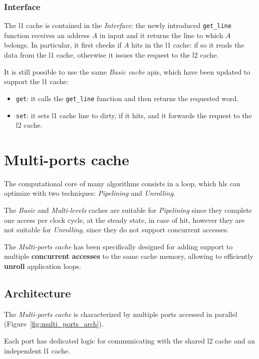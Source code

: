 \documentclass[11pt,a4paper,oneside]{memoir}
\begin{document}
\subsection{Interface}
The \ac{l1} cache is contained in the \emph{Interface}: the newly introduced
\texttt{get\_line} function receives an address $A$ in input and it returns the
line to which $A$ belongs.
In particular, it first checks if $A$ hits in the \ac{l1} cache: if so it reads
the data from the \ac{l1} cache, otherwise it issues the request to the \ac{l2}
cache.

\bigskip
It is still possible to use the same \emph{Basic cache} \acp{api}, which have
been updated to support the \ac{l1} cache:
\begin{itemize}
	\item \texttt{get}: it calls the \texttt{get\_line} function and then
		returns the requested word.
	\item \texttt{set}: it sets \ac{l1} cache line to dirty, if it hits, and
		it forwards the request to the \ac{l2} cache.
\end{itemize}

\chapter{Multi-ports cache}
The computational core of many algorithms consists in a loop, which \ac{hls} can
optimize with two techniques: \emph{Pipelining} and \emph{Unrolling}.

The \emph{Basic} and \emph{Multi-levels} caches are suitable for
\emph{Pipelining} since they complete one access per clock cycle, at the steady
state, in case of hit, however they are not suitable for \emph{Unrolling}, since
they do not support concurrent accesses.

\bigskip
The \emph{Multi-ports cache} has been specifically designed for adding support
to multiple \textbf{concurrent accesses} to the same cache memory, allowing to
efficiently \textbf{unroll} application loops.

\section{Architecture}
The \emph{Multi-ports cache} is characterized by multiple ports accessed in
parallel (Figure~\ref{fig:multi_ports_arch}).

Each port has dedicated logic for communicating with the shared \ac{l2} cache
and an independent \ac{l1} cache.
\end{document}
